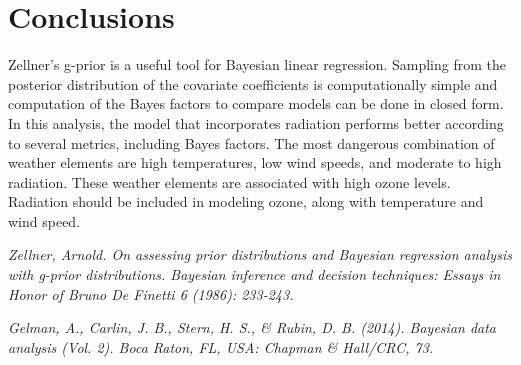 \documentclass{../../tex_template/asaproc}
\begin{document}
\section{Conclusions}
Zellner's g-prior is a useful tool for Bayesian linear regression. Sampling
from the posterior distribution of the covariate coefficients is
computationally simple and computation of the Bayes factors to compare models
can be done in closed form. In this analysis, the model that incorporates radiation
performs better according to several metrics, including Bayes factors. The most
dangerous combination of weather elements are high temperatures, low wind speeds, and
moderate to high radiation. These weather elements are associated with high ozone 
levels. Radiation should be included in modeling ozone, along with temperature and
wind speed. 

\begin{references}
{\footnotesize
\itemsep=3pt
\item {\em Zellner, Arnold. On assessing prior distributions and Bayesian regression analysis with g-prior distributions. Bayesian inference and decision techniques: Essays in Honor of Bruno De Finetti 6 (1986): 233-243.}
\item {\em Gelman, A., Carlin, J. B., Stern, H. S., \& Rubin, D. B. (2014). Bayesian data analysis (Vol. 2). Boca Raton, FL, USA: Chapman \& Hall/CRC, 73.}
}
\end{references}
\end{document}
